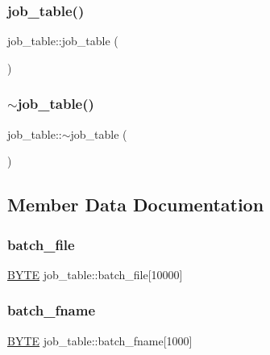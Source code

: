 \subsubsection{\texorpdfstring{job\+\_\+table()}{job\_table()}}
{\footnotesize\ttfamily job\+\_\+table\+::job\+\_\+table (\begin{DoxyParamCaption}{ }\end{DoxyParamCaption})}

\mbox{\label{classjob__table_ab4cddff4c8373752437bc69f7bab89a0}} 
\subsubsection{\texorpdfstring{$\sim$job\+\_\+table()}{~job\_table()}}
{\footnotesize\ttfamily job\+\_\+table\+::$\sim$job\+\_\+table (\begin{DoxyParamCaption}{ }\end{DoxyParamCaption})}



\subsection{Member Data Documentation}
\mbox{\label{classjob__table_ac42aba51a07a55ef59158c64741190e4}} 
\subsubsection{\texorpdfstring{batch\+\_\+file}{batch\_file}}
{\footnotesize\ttfamily \mbox{\hyperlink{galois_8h_ab6cc7b4aeb6ea31aba2b3fbfc83ff5e6}{B\+Y\+TE}} job\+\_\+table\+::batch\+\_\+file\mbox{[}10000\mbox{]}}

\mbox{\label{classjob__table_ae76e0ce0d07159cf8b3b69cd41ca6b6b}} 
\subsubsection{\texorpdfstring{batch\+\_\+fname}{batch\_fname}}
{\footnotesize\ttfamily \mbox{\hyperlink{galois_8h_ab6cc7b4aeb6ea31aba2b3fbfc83ff5e6}{B\+Y\+TE}} job\+\_\+table\+::batch\+\_\+fname\mbox{[}1000\mbox{]}}

